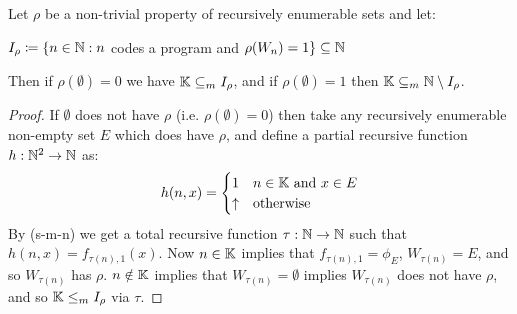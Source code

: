 \documentclass[10pt,a4paper]{article}
\begin{document}
\begin{theorem}
Let $\rho$ be a non-trivial property of recursively enumerable sets and let:
\begin{center}
$I_\rho \coloneqq \{n\in\mathbb{N} : n$ codes a program and $\rho(W_n) = 1\} \subseteq \mathbb{N}$
\end{center}
Then if $\rho(\emptyset) = 0$ we have $\mathbb{K} \subseteq_m I_\rho$, and if $\rho(\emptyset) = 1$ then $\mathbb{K} \subseteq_m \mathbb{N}\setminus I_\rho$.
\end{theorem}
\begin{proof}
If $\emptyset$ does not have $\rho$ (i.e. $\rho(\emptyset) = 0$) then take any recursively enumerable non-empty set $E$ which does have $\rho$, and define a partial recursive function $h:\mathbb{N}^2 \to \mathbb{N}$ as:
\begin{align*}
h(n,x) = \begin{cases} 1 & n\in \mathbb{K} \text{ and } x \in E \\ \uparrow & \text{otherwise} \end{cases}
\end{align*}
By (s-m-n) we get a total recursive function $\tau:\mathbb{N} \to \mathbb{N}$ such that $h(n,x) = f_{\tau(n),1}(x)$. Now $n\in\mathbb{K}$ implies that $f_{\tau(n),1} = \phi_E$, $W_{\tau(n)} = E$, and so $W_{\tau(n)}$ has $\rho$. $n\notin \mathbb{K}$ implies that $W_{\tau(n)} = \emptyset$ implies $W_{\tau(n)}$ does not have $\rho$, and so $\mathbb{K} \leq_m I_{\rho}$ via $\tau$.
\end{proof}
\end{document}
